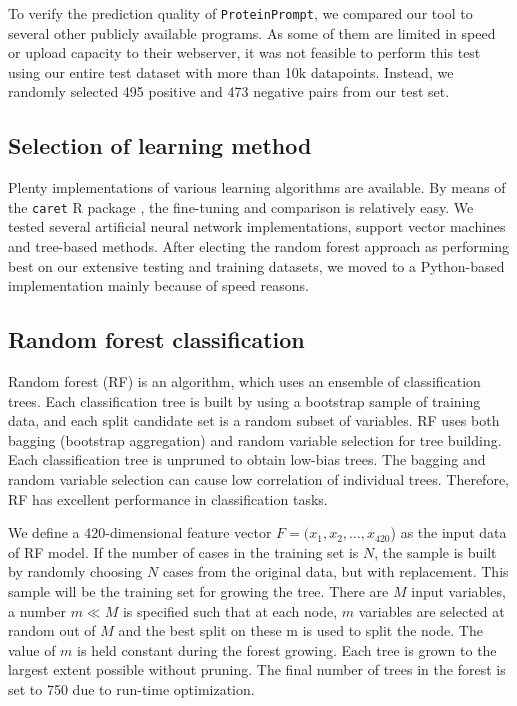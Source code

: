 \documentclass[preprint,3p,times,twocolumn]{elsarticle}
\newcommand{\toolblank}{\texttt{ProteinPrompt}}
\newcommand{\tool}{\toolblank\hspace{2pt}}
\begin{document}
To verify the prediction quality of \tool, we compared our tool to
several other publicly available programs. As some of them are limited
in speed or upload capacity to their webserver, it was not
feasible to perform this test using our entire test dataset with more
than 10k datapoints. Instead, we randomly selected 495 positive and 473
negative pairs from our test set.

\subsection{Selection of learning method}
Plenty implementations of various learning algorithms are
available. By means of the \texttt{caret} R package \cite{Kuhn:2008},
the fine-tuning and comparison is relatively easy. We tested several
artificial neural network implementations, support vector machines and
tree-based methods. After electing the random forest approach as
performing best on our extensive testing and training datasets,
we moved to a Python-based implementation mainly
because of speed reasons.  

\subsection{Random forest classification}
Random forest (RF) is an algorithm, which uses an ensemble of
classification trees. Each classification tree is built by using a
bootstrap sample of training data, and each split candidate set is a
random subset of variables. RF uses both bagging (bootstrap
aggregation) and random variable selection for tree building. Each
classification tree is unpruned to obtain low-bias trees. The bagging
and random variable selection can cause low correlation of individual
trees. Therefore, RF has excellent performance in classification
tasks. 

We define a 420-dimensional feature vector $F=(x_1,x_2,
\dots,x_{420}$) as the input data of RF model. If the number of cases
in the training set is $N$, the sample is built by randomly choosing
$N$ cases from the original data, but with replacement. This sample
will be the training set for growing the tree. There are $M$ input
variables, a number $m \ll M$ is specified such that at each node, $m$
variables are selected at random out of $M$ and the best split on
these m is used to split the node. The value of $m$ is held constant
during the forest growing. Each tree is grown to the largest extent
possible without pruning. The final number of trees in the forest is
set to 750 due to run-time optimization. 
\end{document}
